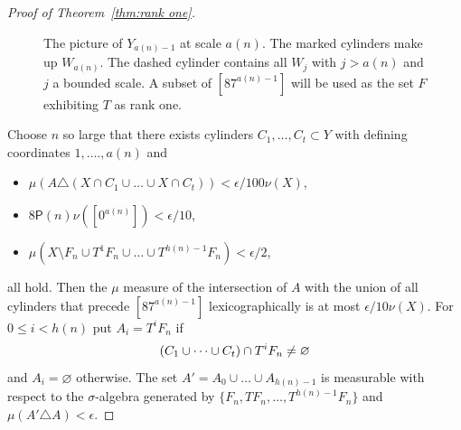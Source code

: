 \documentclass[10pt]{amsart}
\theoremstyle{definition}\newtheorem{defi}[theo]{Definition}\newtheorem{rema}[theo]{Remark}\newtheorem{exam}[theo]{Example}\newtheorem{exem}[theo]{Example}\newtheorem{nota}[theo]{Notation}
\renewcommand{\P}{\mathsf{P}}
\renewcommand{\emptyset}{\varnothing}
\let\originalleft\left
\let\originalright\right
\renewcommand{\left}{\mathopen{}\mathclose\bgroup\originalleft}
\renewcommand{\right}{\aftergroup\egroup\originalright}
\begin{document}
\begin{proof}[Proof of Theorem~\ref{thm:rank one}]
\begin{figure}[!h]
\caption{The picture of $Y_{a(n)-1}$ at scale $a(n)$. The marked cylinders make up $W_{a(n)}$. The dashed cylinder contains all $W_j$ with $j > a(n)$ and $j$ a bounded scale. A subset of $[87^{a(n)-1}]$ will be used as the set $F$ exhibiting $T$ as rank one.}\label{fig:rank_one}
\end{figure}

\pagebreak
Choose $n$ so large that there exists cylinders $C_1,\dots,C_t\subset Y$ with defining coordinates $1,\dots.,a(n)$ and
\begin{itemize}
\item $\mu (A \triangle (X \cap C_1 \cup \dots \cup X \cap C_t) ) < \epsilon/100 \nu(X)$,
\item $8 \P(n) \nu([0^{a(n)}]) < \epsilon/10$,
\item $\mu(X \setminus F_n \cup T^1 F_n \cup \dots \cup T^{h(n)-1} F_n) < \epsilon/2$,
\end{itemize}
all hold. Then the $\mu$ measure of the intersection of $A$ with the union of all cylinders that precede $[87^{a(n) - 1}]$ lexicographically is at most $\epsilon/10 \nu(X)$. For $0 \le i < h(n)$ put $A_i = T^i F_n$ if
\[
\left(C_1 \cup \dots \cup C_t\right) \cap T^i F_n \ne \emptyset
\]
and $A_i = \emptyset$ otherwise. The set $A' = A_0 \cup \dots \cup A_{h(n)-1}$ is measurable with respect to the $\sigma$-algebra generated by $\{ F_n, T F_n, \dots, T^{h(n)-1} F_n \}$ and $\mu(A' \triangle A) < \epsilon$.
\end{proof}
\end{document}
